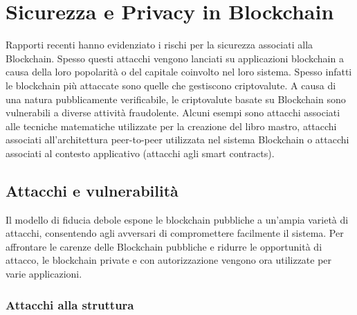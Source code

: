 \chapter{Sicurezza e Privacy in Blockchain}

Rapporti recenti hanno evidenziato i rischi per la sicurezza associati alla Blockchain. Spesso questi attacchi vengono lanciati su applicazioni blockchain a causa della loro popolarità o del capitale coinvolto nel loro sistema. Spesso infatti le blockchain più attaccate sono quelle che gestiscono criptovalute. A causa di una natura pubblicamente verificabile, le criptovalute basate su Blockchain sono vulnerabili a diverse attività fraudolente. Alcuni esempi sono attacchi associati alle tecniche matematiche utilizzate per la creazione del libro mastro, attacchi associati all'architettura peer-to-peer utilizzata nel sistema Blockchain o attacchi associati al contesto applicativo (attacchi agli smart contracts).

\section{Attacchi e vulnerabilità}

Il modello di fiducia debole espone le blockchain pubbliche a un'ampia varietà di attacchi, consentendo agli avversari di compromettere facilmente il sistema. Per affrontare le carenze delle Blockchain pubbliche e ridurre le opportunità di attacco, le blockchain private e con autorizzazione vengono ora utilizzate per varie applicazioni.

\subsection{Attacchi alla struttura}

